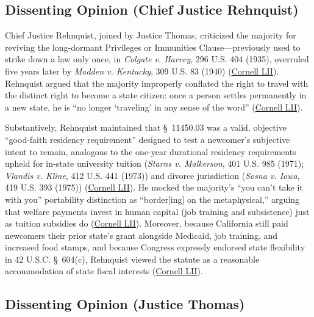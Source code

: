 \documentclass[12pt]{article}
\begin{document}
\subsection{Dissenting Opinion (Chief Justice Rehnquist)}

Chief Justice Rehnquist, joined by Justice Thomas, criticized the majority for reviving the long-dormant Privileges or Immunities Clause---previously used to strike down a law only once, in \textit{Colgate v. Harvey}, 296 U.S. 404 (1935), overruled five years later by \textit{Madden v. Kentucky}, 309 U.S. 83 (1940) (\href{https://www.law.cornell.edu/supct/html/98-97.ZD.html}{Cornell LII}). Rehnquist argued that the majority improperly conflated the right to travel with the distinct right to become a state citizen: once a person settles permanently in a new state, he is ``no longer `traveling' in any sense of the word'' (\href{https://www.law.cornell.edu/supct/html/98-97.ZD.html}{Cornell LII}).

Substantively, Rehnquist maintained that \S~11450.03 was a valid, objective ``good-faith residency requirement'' designed to test a newcomer's subjective intent to remain, analogous to the one-year durational residency requirements upheld for in-state university tuition (\textit{Starns v. Malkerson}, 401 U.S. 985 (1971); \textit{Vlandis v. Kline}, 412 U.S. 441 (1973)) and divorce jurisdiction (\textit{Sosna v. Iowa}, 419 U.S. 393 (1975)) (\href{https://www.law.cornell.edu/supct/html/98-97.ZD.html}{Cornell LII}). He mocked the majority's ``you can't take it with you'' portability distinction as ``border[ing] on the metaphysical,'' arguing that welfare payments invest in human capital (job training and subsistence) just as tuition subsidies do (\href{https://www.law.cornell.edu/supct/html/98-97.ZD.html}{Cornell LII}). Moreover, because California still paid newcomers their prior state's grant alongside Medicaid, job training, and increased food stamps, and because Congress expressly endorsed state flexibility in 42 U.S.C. \S~604(c), Rehnquist viewed the statute as a reasonable accommodation of state fiscal interests (\href{https://www.law.cornell.edu/supct/html/98-97.ZD.html}{Cornell LII}).

\subsection{Dissenting Opinion (Justice Thomas)}
\end{document}
